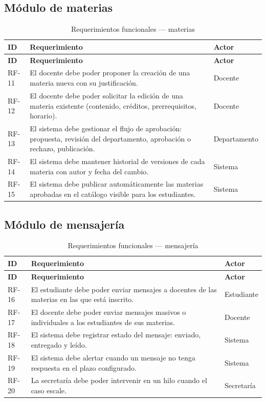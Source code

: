 \subsection{Módulo de materias}

\begin{longtable}{@{}p{1.5cm} p{6.5cm} p{4.5cm}@{}}
\caption{Requerimientos funcionales --- materias}
\label{tab:rf-materias}\\
\toprule
\rowcolor{naranjaClaro}
\textbf{ID} & \textbf{Requerimiento} & \textbf{Actor} \\
\midrule
\endfirsthead
\toprule
\rowcolor{naranjaClaro}
\textbf{ID} & \textbf{Requerimiento} & \textbf{Actor} \\
\midrule
\endhead
RF-11 & El docente debe poder proponer la creación de una materia nueva con su justificación. & Docente \\
RF-12 & El docente debe poder solicitar la edición de una materia existente (contenido, créditos, prerrequisitos, horario). & Docente \\
RF-13 & El sistema debe gestionar el flujo de aprobación: propuesta, revisión del departamento, aprobación o rechazo, publicación. & Departamento \\
RF-14 & El sistema debe mantener historial de versiones de cada materia con autor y fecha del cambio. & Sistema \\
RF-15 & El sistema debe publicar automáticamente las materias aprobadas en el catálogo visible para los estudiantes. & Sistema \\
\bottomrule
\end{longtable}

\subsection{Módulo de mensajería}

\begin{longtable}{@{}p{1.5cm} p{6.5cm} p{4.5cm}@{}}
\caption{Requerimientos funcionales --- mensajería}
\label{tab:rf-mensajes}\\
\toprule
\rowcolor{moradoClaro}
\textbf{ID} & \textbf{Requerimiento} & \textbf{Actor} \\
\midrule
\endfirsthead
\toprule
\rowcolor{moradoClaro}
\textbf{ID} & \textbf{Requerimiento} & \textbf{Actor} \\
\midrule
\endhead
RF-16 & El estudiante debe poder enviar mensajes a docentes de las materias en las que está inscrito. & Estudiante \\
RF-17 & El docente debe poder enviar mensajes masivos o individuales a los estudiantes de sus materias. & Docente \\
RF-18 & El sistema debe registrar estado del mensaje: enviado, entregado y leído. & Sistema \\
RF-19 & El sistema debe alertar cuando un mensaje no tenga respuesta en el plazo configurado. & Sistema \\
RF-20 & La secretaría debe poder intervenir en un hilo cuando el caso escale. & Secretaría \\
\bottomrule
\end{longtable}


